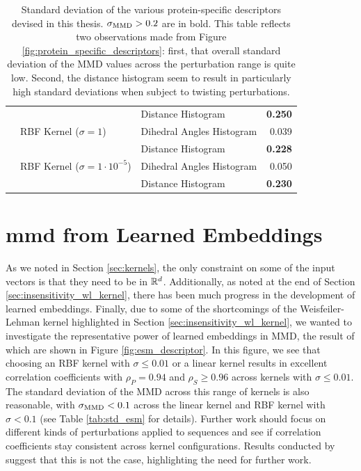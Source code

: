 \begin{table}
{\begin{tabular}{lllr}
                    &             & Distance Histogram &           \textbf{0.250} \\
                    & RBF Kernel ($\sigma=1$) & Dihedral Angles Histogram &           0.039 \\
                    &             & Distance Histogram &           \textbf{0.228} \\
                    & RBF Kernel ($\sigma=1\cdot 10^{-5}$) & Dihedral Angles Histogram &           0.050 \\
                    &             & Distance Histogram &           \textbf{0.230} \\
      \bottomrule
    \end{tabular}
  }
  \caption[Standard deviation of the various protein-specific descriptors
devised in this thesis.]{Standard deviation of the various protein-specific
descriptors devised in this thesis. $\sigma_{\text{MMD}}>0.2$ are in bold. This table
reflects two observations made from Figure
\ref{fig:protein_specific_descriptors}: first, that overall standard deviation
of the MMD values across the perturbation range is quite low. Second, the
distance histogram seem to result in particularly high standard deviations when
subject to twisting perturbations.
}
  \label{tab:protein_descriptors_std}
\end{table}

\section{\acrshort{mmd} from Learned Embeddings}\label{sec:results_esm}

As we noted in Section \ref{sec:kernels}, the only constraint on some of the
input vectors is that they need to be in $\mathbb{R}^d$. Additionally, as noted at the
end of Section \ref{sec:insensitivity_wl_kernel}, there has been much progress
in the development of learned embeddings. Finally, due to some of the
shortcomings of the Weisfeiler-Lehman kernel highlighted in Section
\ref{sec:insensitivity_wl_kernel}, we wanted to investigate the representative
power of learned embeddings in MMD, the result of which are shown in Figure
\ref{fig:esm_descriptor}. In this figure, we see that choosing an RBF kernel
with $\sigma\leq 0.01$ or a linear kernel results in excellent correlation
coefficients with $\rho_P=0.94$ and $\rho_S\geq 0.96$ across kernels with
$\sigma\leq 0.01$. The standard deviation of the MMD across this range of
kernels is also reasonable, with $\sigma_{\text{MMD}}<0.1$ across the linear kernel and
RBF kernel with $\sigma<0.1$ (see Table \ref{tab:std_esm} for details). Further
work should focus on different kinds of perturbations applied to sequences and
see if correlation coefficients stay consistent across kernel configurations.
Results conducted by \cite{kucera2022conditional} suggest that this is not the
case, highlighting the need for further work.

